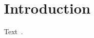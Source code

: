 \documentclass[12pt,a4paper]{article}
\begin{document}
\section{Introduction}
Text~\cite{ref1}.
\end{document}

